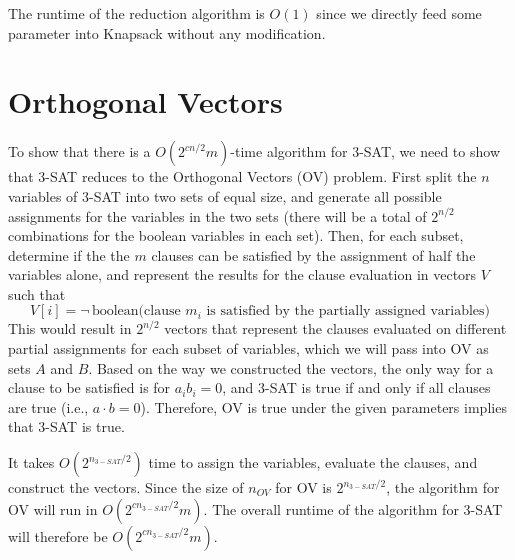 \documentclass[11pt]{article}
\theoremstyle{definition}
\theoremstyle{remark}
\begin{document}
\begin{enumerate}
The runtime of the reduction algorithm is $O(1)$ since we directly feed some parameter into Knapsack without any modification.

\section{Orthogonal Vectors}
To show that there is a $O(2^{cn/2}m)$-time algorithm for 3-SAT, we need to show that 3-SAT reduces to the Orthogonal Vectors (OV) problem. First split the $n$ variables of 3-SAT into two sets of equal size, and generate all possible assignments for the variables in the two sets (there will be a total of $2^{n/2}$ combinations for the boolean variables in each set). Then, for each subset, determine if the the $m$ clauses can be satisfied by the assignment of half the variables alone, and represent the results for the clause evaluation in vectors $V$ such that 
\[
V[i] = \neg \, \text{boolean(clause } m_i \text{ is satisfied by the partially assigned variables)}
\]
This would result in $2^{n/2}$ vectors that represent the clauses evaluated on different partial assignments for each subset of variables, which we will pass into OV as sets $A$ and $B$. Based on the way we constructed the vectors, the only way for a clause to be satisfied is for $a_ib_i = 0$, and 3-SAT is true if and only if all clauses are true (i.e., $a\cdot b = 0$). Therefore, OV is true under the given parameters implies that 3-SAT is true. 

It takes $O(2^{n_{3-SAT}/2})$ time to assign the variables, evaluate the clauses, and construct the vectors. Since the size of $n_{OV}$ for OV is $2^{n_{3-SAT}/2}$, the algorithm for OV will run in $O(2^{cn_{3-SAT}/2}m)$. The overall runtime of the algorithm for 3-SAT will therefore be $O(2^{cn_{3-SAT}/2}m)$.

\end{enumerate}
\end{document}
